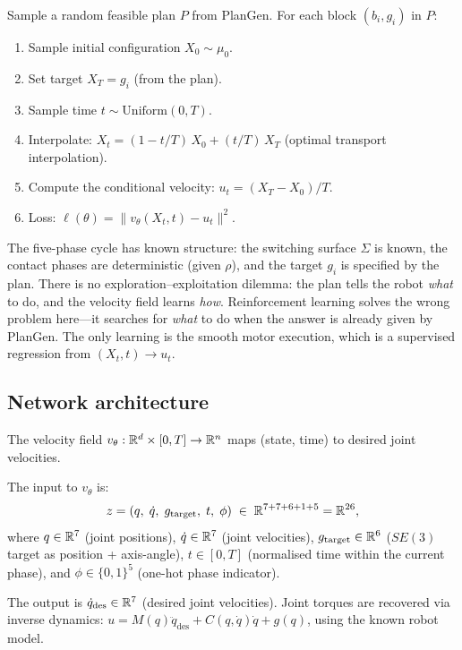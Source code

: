 \begin{definition}\label{def:m-flow-loss}
Sample a random feasible plan $P$ from PlanGen.  For each block
$(b_i, g_i)$ in $P$:
\begin{enumerate}[label=(\arabic*),nosep]
  \item Sample initial configuration $X_0 \sim \mu_0$.
  \item Set target $X_T = g_i$ (from the plan).
  \item Sample time $t \sim \mathrm{Uniform}(0, T)$.
  \item Interpolate: $X_t = (1 - t/T)\,X_0 + (t/T)\,X_T$
  (optimal transport interpolation).
  \item Compute the conditional velocity:
  $u_t = (X_T - X_0)/T$.
  \item Loss:
  $\ell(\theta) = \|v_\theta(X_t, t) - u_t\|^2$.
\end{enumerate}
\end{definition}

\begin{remark}
\label{rem:m-why-flow}
The five-phase cycle has known structure: the switching surface
$\Sigma$ is known, the contact phases are deterministic
(given $\rho$), and the target $g_i$ is specified by the plan.
There is no exploration--exploitation dilemma: the plan tells
the robot \emph{what} to do, and the velocity field learns
\emph{how}.  Reinforcement learning solves the wrong problem
here---it searches for \emph{what} to do when the answer is
already given by PlanGen.  The only learning is the smooth
motor execution, which is a supervised regression from
$(X_t, t) \to u_t$.
\end{remark}

\subsection{Network architecture}

The velocity field $v_\theta : \mathbb{R}^d \times [0,T] \to \mathbb{R}^n$
maps (state, time) to desired joint velocities.

\begin{definition}
\label{def:m-network}
The input to $v_\theta$ is:
\[
  z = (q,\; \dot{q},\; g_\mathrm{target},\; t,\; \phi)
  \;\in\; \mathbb{R}^{7 + 7 + 6 + 1 + 5} = \mathbb{R}^{26},
\]
where $q \in \mathbb{R}^7$ (joint positions), $\dot{q} \in \mathbb{R}^7$
(joint velocities), $g_\mathrm{target} \in \mathbb{R}^6$ ($SE(3)$ target
as position + axis-angle), $t \in [0,T]$ (normalised time within
the current phase), and $\phi \in \{0,1\}^5$ (one-hot phase
indicator).

The output is $\dot{q}_\mathrm{des} \in \mathbb{R}^7$ (desired joint
velocities).  Joint torques are recovered via inverse dynamics:
$u = M(q)\ddot{q}_\mathrm{des} + C(q,\dot{q})\dot{q} + g(q)$,
using the known robot model.
\end{definition}

